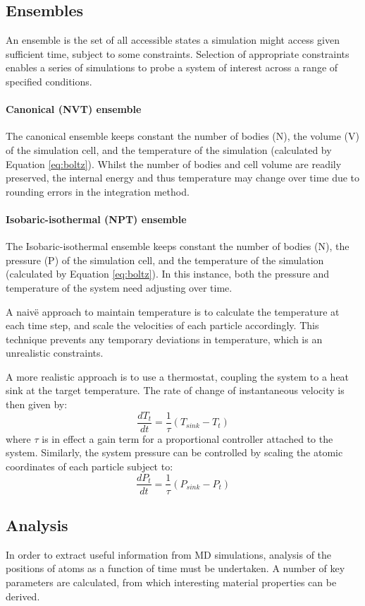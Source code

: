 \subsection{Ensembles}
An ensemble is the set of all accessible states a simulation might access given sufficient time, subject to some constraints.
Selection of appropriate constraints enables a series of simulations to probe a system of interest across a range of specified conditions.
\paragraph{Canonical (NVT) ensemble}
The canonical ensemble keeps constant the number of bodies (N), the volume (V) of the simulation cell, and the temperature of the simulation (calculated by Equation \ref{eq:boltz}).
Whilst the number of bodies and cell volume are readily preserved, the internal energy and thus temperature may change over time due to rounding errors in the integration method.

\paragraph{Isobaric-isothermal (NPT) ensemble}
The Isobaric-isothermal ensemble keeps constant the number of bodies (N), the pressure (P) of the simulation cell, and the temperature of the simulation (calculated by Equation \ref{eq:boltz}).
In this instance, both the pressure and temperature of the system need adjusting over time.

A naiv{\"e} approach to maintain temperature is to calculate the temperature at each time step, and scale the velocities of each particle accordingly.
This technique prevents any temporary deviations in temperature, which is an unrealistic constraints.

A more realistic approach is to use a thermostat, coupling the system to a heat sink at the target temperature.
The rate of change of instantaneous velocity is then given by:
\begin{equation}
\frac{dT_{t}}{dt} = \frac{1}{\tau}(T_{sink} - T_t)
\end{equation}
where $\tau$ is in effect a gain term for a proportional controller attached to the system.
Similarly, the system pressure can be controlled by scaling the atomic coordinates of each particle subject to:
\begin{equation}
\frac{dP_{t}}{dt} = \frac{1}{\tau}(P_{sink} - P_t)
\end{equation}
\newpage
\subsection{Analysis}
In order to extract useful information from MD simulations, analysis of the positions of atoms as a function of time must be undertaken.
A number of key parameters are calculated, from which interesting material properties can be derived.
